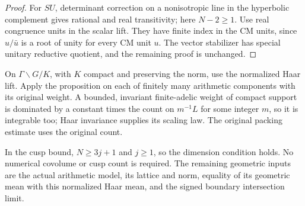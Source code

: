 \begin{proof}
For $SU$, determinant correction on a nonisotropic line in the
hyperbolic complement gives rational and real transitivity; here
$N-2\ge1$. Use real congruence units in the scalar lift. They
have finite index in the CM units, since $u/\bar u$ is a root of
unity for every CM unit $u$. The vector stabilizer has special
unitary reductive quotient, and the remaining proof is unchanged.
\end{proof}

On $\Gamma\backslash G/K$, with $K$ compact and preserving the
norm, use the normalized Haar lift. Apply the proposition on each
of finitely many arithmetic components with its original weight.
A bounded, invariant finite-adelic weight of compact support is
dominated by a constant times the count on $m^{-1}L$ for some
integer $m$, so it is integrable too; Haar invariance supplies its
scaling law. The original packing estimate uses the original count.

In the cusp bound, $N\ge3j+1$ and $j\ge1$, so the dimension
condition holds. No numerical covolume or cusp count is required.
The remaining geometric inputs are the actual arithmetic model,
its lattice and norm, equality of its geometric mean with this
normalized Haar mean, and the signed boundary intersection limit.
